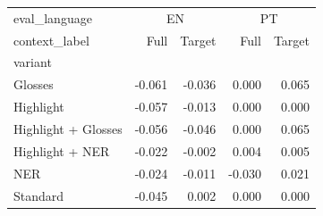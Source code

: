 \begin{tabular}{lrrrr}
\toprule
eval\_language & \multicolumn{2}{c}{EN} & \multicolumn{2}{c}{PT} \\
context\_label & Full & Target & Full & Target \\
variant &  &  &  &  \\
\midrule
Glosses & -0.061 & -0.036 & 0.000 & 0.065 \\
Highlight & -0.057 & -0.013 & 0.000 & 0.000 \\
Highlight + Glosses & -0.056 & -0.046 & 0.000 & 0.065 \\
Highlight + NER & -0.022 & -0.002 & 0.004 & 0.005 \\
NER & -0.024 & -0.011 & -0.030 & 0.021 \\
Standard & -0.045 & 0.002 & 0.000 & 0.000 \\
\bottomrule
\end{tabular}
